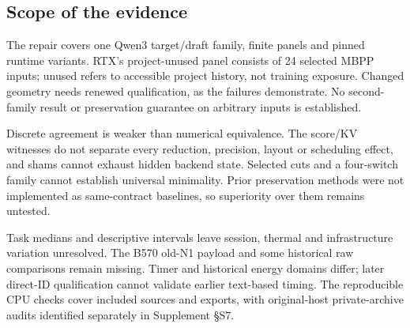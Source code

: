 \subsection{Scope of the evidence}
The repair covers one Qwen3 target/draft family, finite panels and pinned runtime variants. RTX's project-unused panel consists of 24 selected MBPP inputs; unused refers to accessible project history, not training exposure. Changed geometry needs renewed qualification, as the failures demonstrate. No second-family result or preservation guarantee on arbitrary inputs is established.

Discrete agreement is weaker than numerical equivalence. The score/KV witnesses do not separate every reduction, precision, layout or scheduling effect, and shams cannot exhaust hidden backend state. Selected cuts and a four-switch family cannot establish universal minimality. Prior preservation methods were not implemented as same-contract baselines, so superiority over them remains untested.

Task medians and descriptive intervals leave session, thermal and infrastructure variation unresolved. The B570 old-N1 payload and some historical raw comparisons remain missing. Timer and historical energy domains differ; later direct-ID qualification cannot validate earlier text-based timing. The reproducible CPU checks cover included sources and exports, with original-host private-archive audits identified separately in Supplement \S S7.
